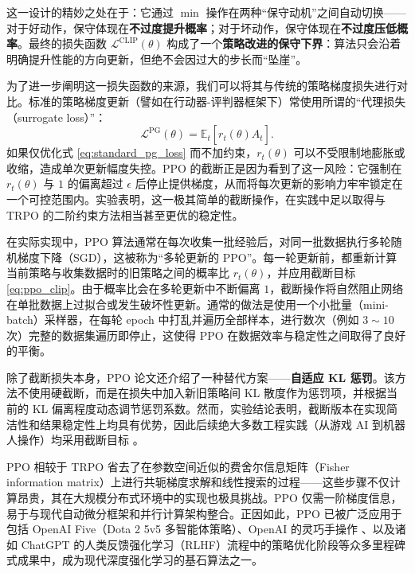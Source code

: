 这一设计的精妙之处在于：它通过 $\min$ 操作在两种“保守动机”之间自动切换——对于好动作，保守体现在\textbf{不过度提升概率}；对于坏动作，保守体现在\textbf{不过度压低概率}。最终的损失函数 $\mathcal{L}^{\text{CLIP}}(\theta)$ 构成了一个\textbf{策略改进的保守下界}：算法只会沿着明确提升性能的方向更新，但绝不会因过大的步长而“坠崖”。

为了进一步阐明这一损失函数的来源，我们可以将其与传统的策略梯度损失进行对比。标准的策略梯度更新（譬如在行动器-评判器框架下）常使用所谓的“代理损失（surrogate loss）”：
\begin{equation}
\mathcal{L}^{\text{PG}}(\theta) = \mathbb{E}_t \left[ r_t(\theta) \hat{A}_t \right].
\label{eq:standard_pg_loss}
\end{equation}
如果仅优化式 \eqref{eq:standard_pg_loss} 而不加约束，$r_t(\theta)$ 可以不受限制地膨胀或收缩，造成单次更新幅度失控。PPO 的截断正是因为看到了这一风险：它强制在 $r_t(\theta)$ 与 $1$ 的偏离超过 $\epsilon$ 后停止提供梯度，从而将每次更新的影响力牢牢锁定在一个可控范围内。实验表明，这一极其简单的截断操作，在实践中足以取得与 TRPO 的二阶约束方法相当甚至更优的稳定性。

在实际实现中，PPO 算法通常在每次收集一批经验后，对同一批数据执行多轮随机梯度下降（SGD），这被称为“多轮更新的 PPO”。每一轮更新前，都重新计算当前策略与收集数据时的旧策略之间的概率比 $r_t(\theta)$，并应用截断目标 \eqref{eq:ppo_clip}。由于概率比会在多轮更新中不断偏离 $1$，截断操作将自然阻止网络在单批数据上过拟合或发生破坏性更新。通常的做法是使用一个小批量（mini-batch）采样器，在每轮 epoch 中打乱并遍历全部样本，进行数次（例如 $3\sim 10$ 次）完整的数据集遍历即停止，这使得 PPO 在数据效率与稳定性之间取得了良好的平衡。

除了截断损失本身，PPO 论文还介绍了一种替代方案——\textbf{自适应 KL 惩罚}。该方法不使用硬截断，而是在损失中加入新旧策略间 KL 散度作为惩罚项，并根据当前的 KL 偏离程度动态调节惩罚系数。然而，实验结论表明，截断版本在实现简洁性和结果稳定性上均具有优势，因此后续绝大多数工程实践（从游戏 AI 到机器人操作）均采用截断目标 \cite{openai2019dota2largescale,openai2019solvingrubikscuberobot} 。

PPO 相较于 TRPO \cite{schulman2017trustregionpolicyoptimization} 省去了在参数空间近似的费舍尔信息矩阵（Fisher information matrix）上进行共轭梯度求解和线性搜索的过程——这些步骤不仅计算昂贵，其在大规模分布式环境中的实现也极具挑战。PPO 仅需一阶梯度信息，易于与现代自动微分框架和并行计算架构整合。正因如此，PPO 已被广泛应用于包括 OpenAI Five（Dota 2 5v5 多智能体策略）\cite{openai2019dota2largescale}、OpenAI 的灵巧手操作 \cite{openai2019solvingrubikscuberobot}、以及诸如 ChatGPT 的人类反馈强化学习（RLHF）流程中的策略优化阶段等众多里程碑式成果中，成为现代深度强化学习的基石算法之一。

